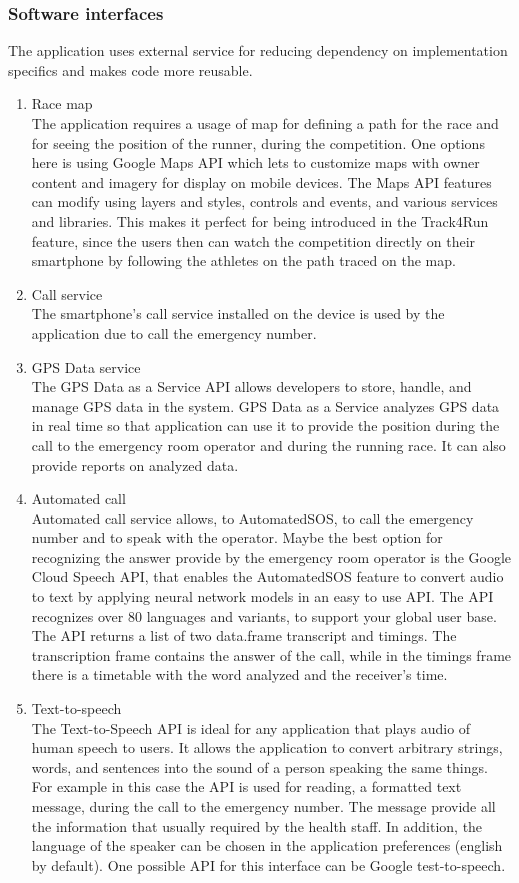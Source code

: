 \subsubsection{Software interfaces}
The application uses external service for reducing dependency on implementation specifics and makes code more reusable.
\begin{enumerate}
\item Race map\\
The application requires a usage of map for defining a path for the race and for seeing the position of the runner, during the competition. One options here is using Google Maps API which lets to customize maps with owner content and imagery for display on mobile devices. The Maps API features can modify using layers and styles, controls and events, and various services and libraries. This makes it perfect for being introduced in the Track4Run feature, since the users then can watch the competition directly on their smartphone by following the athletes on the path traced on the map. 
\item Call service\\
The smartphone's call service installed on the device is used by the application due to call the emergency number.
\item GPS Data service\\
The GPS Data as a Service API allows developers to store, handle, and manage GPS data in the system. GPS Data as a Service analyzes GPS data in real time so that application can use it to provide the position during the call to the emergency room operator and during the running race. It can also provide reports on analyzed data. 
\item Automated call\\
Automated call service allows, to AutomatedSOS, to call the emergency number and to speak with the operator.
Maybe the best option for recognizing the answer provide by the emergency room operator is the Google Cloud Speech API, that enables the AutomatedSOS feature to convert audio to text by applying neural network models in an easy to use API. The API recognizes over 80 languages and variants, to support your global user base. The API returns a list of two data.frame transcript and timings. The transcription frame contains the answer of the call, while in the timings frame there is a timetable with the word analyzed and the receiver's time. 
\item Text-to-speech\\
The Text-to-Speech API is ideal for any application that plays audio of human speech to users. It allows the application to convert arbitrary strings, words, and sentences into the sound of a person speaking the same things. For example in this case the API is used for reading, a formatted text message, during the call to the emergency number. The message provide all the information that usually required by the health staff. In addition, the language of the speaker can be chosen in the application preferences (english by default). One possible API for this interface can be Google test-to-speech.
\end{enumerate}
